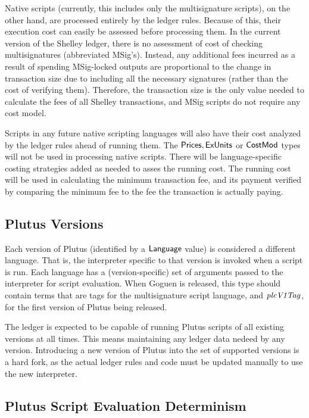 Native scripts (currently, this includes only the multisignature scripts), on the
other hand, are processed entirely by the ledger rules.
Because of this, their execution cost can easily be assessed before processing them.
In the current version of the Shelley ledger, there is no assessment of cost
of checking multisignatures (abbreviated MSig's). Instead, any additional fees 
incurred as a result of
spending MSig-locked outputs are proportional to the change in transaction
size due to including all the necessary signatures (rather than the
cost of verifying them). Therefore, the transaction size is the only
value needed to calculate the fees of all Shelley transactions, and MSig
scripts do not require any cost model.

Scripts in any future native scripting languages will also
have their cost analyzed by the ledger rules ahead of running them.
The $\mathsf{Prices}, \mathsf{ExUnits}$ or $\mathsf{CostMod}$ types will not be used
in processing native scripts. There will be language-specific
costing strategies added as needed to asses the running cost.
The running cost will be used in calculating the minimum transaction
fee, and its payment verified by comparing the minimum fee to the fee the transaction
is actually paying.

\subsection{Plutus Versions}
\label{sec:versions}

Each
version of Plutus (identified by a $\mathsf{Language}$ value) is considered a different
language. That is, the interpreter
specific to that version is invoked when a script is run. Each language
has a (version-specific) set of arguments passed to the interpreter
for script evaluation. When Goguen is released, this type should contain
terms that are tags for the multisignature script language, and $\mathit{plcV1Tag}$,
for the first version of Plutus being released.

The ledger is expected to be capable of running Plutus scripts of
all existing versions at all times. This means maintaining any ledger
data nedeed by any version. Introducing a new version of Plutus
into the set of supported versions is a hard fork, as the actual ledger rules
and code must be updated manually to use the new interpreter.

\subsection{Plutus Script Evaluation Determinism}
\label{sec:determinism}

